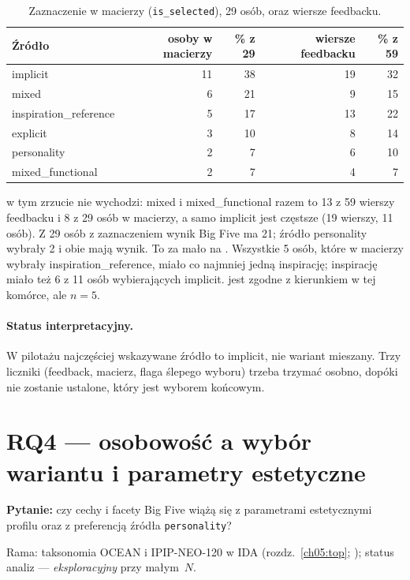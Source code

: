 \begin{table}[htbp]
  \centering
  \small
  \caption{Zaznaczenie w macierzy (\texttt{is\_selected}), 29 osób, oraz wiersze feedbacku.}
  \label{tab:ch08:sources}
  \begin{tabular}{lrrrr}
    \toprule
    Źródło & osoby w macierzy & \% z 29 & wiersze feedbacku & \% z 59 \\
    \midrule
    implicit & 11 & 38 & 19 & 32 \\
    mixed & 6 & 21 & 9 & 15 \\
    inspiration\_reference & 5 & 17 & 13 & 22 \\
    explicit & 3 & 10 & 8 & 14 \\
    personality & 2 & 7 & 6 & 10 \\
    mixed\_functional & 2 & 7 & 4 & 7 \\
    \bottomrule
  \end{tabular}
\end{table}

\noindent
{} w tym zrzucie nie wychodzi: mixed i mixed\_functional razem to 13 z 59 wierszy feedbacku i 8 z 29 osób w macierzy, a samo implicit jest częstsze (19 wierszy, 11 osób).
Z 29 osób z zaznaczeniem wynik Big Five ma 21; źródło personality wybrały 2 i obie mają wynik. To za mało na .
Wszystkie 5 osób, które w macierzy wybrały inspiration\_reference, miało co najmniej jedną inspirację; inspirację miało też 6 z 11 osób wybierających implicit.  jest zgodne z kierunkiem w tej komórce, ale $n=5$.

\paragraph{Status interpretacyjny.}
W pilotażu najczęściej wskazywane źródło to implicit, nie wariant mieszany. Trzy liczniki (feedback, macierz, flaga ślepego wyboru) trzeba trzymać osobno, dopóki nie zostanie ustalone, który jest wyborem końcowym.

\section{RQ4 --- osobowość a wybór wariantu i parametry estetyczne}
\label{ch08:sec:rq4}
\label{ch08:sec:personality}

\textbf{Pytanie:} czy cechy i facety Big Five wiążą się z parametrami estetycznymi profilu oraz z preferencją źródła \texttt{personality}?

Rama: taksonomia OCEAN i IPIP-NEO-120 w IDA (rozdz.~\ref{ch05:top}; \cite{john2008bigfive}); status analiz --- \emph{eksploracyjny} przy małym~$N$.


